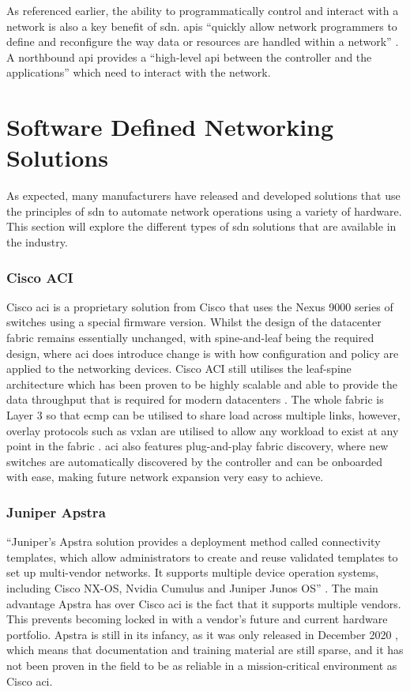 As referenced earlier, the ability to programmatically control and interact with a network is also a key benefit of \gls{sdn}. \gls{api}s ``quickly allow network programmers to define and reconfigure the way data or resources are handled within a network'' \citep{9}. A northbound \gls{api} provides a ``high-level \gls{api} between the controller and the applications'' \citep{6844664} which need to interact with the network.
\section{Software Defined Networking Solutions}
\label{litreview:types}
As expected, many manufacturers have released and
developed solutions that use the principles of \gls{sdn} to automate network
operations using a variety of hardware. This section will explore the different
types of \gls{sdn} solutions that are available in the industry.

\subsubsection{Cisco ACI}
Cisco \gls{aci} is a proprietary solution from Cisco
that uses the Nexus 9000 series of switches using a special firmware version.
Whilst the design of the datacenter fabric remains essentially unchanged, with
spine-and-leaf being the required design, where \gls{aci} does introduce change
is with how configuration and policy are applied to the networking devices.
Cisco ACI still utilises the leaf-spine architecture which has been proven to
be highly scalable and able to provide the data throughput that is required for modern
datacenters \citep{7}. The whole fabric is Layer 3 so that \gls{ecmp} can be utilised to
share load across multiple links, however, overlay protocols such as
\gls{vxlan} are utilised to allow any workload to exist at any point in the
fabric \citep{duffy2014cisco}.
\gls{aci} also features plug-and-play fabric
discovery, where new switches are automatically discovered by the controller
and can be onboarded with ease, making future network expansion very easy to
achieve.

\subsubsection{Juniper Apstra}
``Juniper’s Apstra solution provides
a
deployment method called connectivity templates, which allow administrators to
create and reuse validated templates to set up multi-vendor networks. It
supports multiple device operation systems, including Cisco NX-OS, Nvidia
Cumulus and Juniper Junos OS'' \citep{9914530}. The main advantage Apstra has over Cisco
\gls{aci} is the fact that it supports multiple vendors. This prevents becoming locked in with a vendor's future and current hardware portfolio. Apstra is still in its
infancy, as it was only released in December 2020 \citep{9914530}, which means
that documentation and training material are still sparse, and it has not been
proven in the field to be as reliable in a mission-critical environment as
Cisco \gls{aci}.

